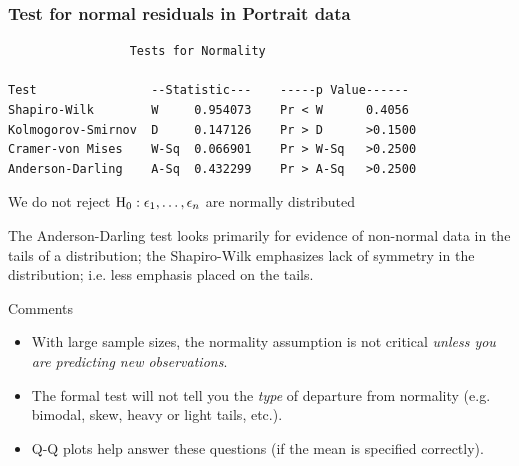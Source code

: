 \documentclass{beamer}
\begin{document}
\begin{frame}[fragile]
\frametitle{Test for normal residuals in Portrait data}
\begin{small}
\begin{verbatim}
                 Tests for Normality
                 
Test                --Statistic---    -----p Value------
Shapiro-Wilk        W     0.954073    Pr < W      0.4056
Kolmogorov-Smirnov  D     0.147126    Pr > D      >0.1500
Cramer-von Mises    W-Sq  0.066901    Pr > W-Sq   >0.2500
Anderson-Darling    A-Sq  0.432299    Pr > A-Sq   >0.2500
\end{verbatim}
\end{small}
\vspace{10pt}

We do not reject ${\rm H}_0: \epsilon_1,\ldots,\epsilon_n$ are normally distributed
\vspace{10pt}

\pause The Anderson-Darling test looks primarily for evidence of non-normal data in the tails of a distribution; the Shapiro-Wilk emphasizes lack of symmetry in the distribution; i.e. less emphasis placed on the tails.
\end{frame}

\begin{frame}{Comments}
\begin{itemize}
\item With large sample sizes, the normality assumption is not
critical \textit{unless you are predicting new observations}.
\item<2-> The formal test will not tell you the \textit{type} of departure from
normality (e.g. bimodal, skew, heavy or light tails, etc.).
\item<2-> Q-Q plots help answer these questions (if the mean is
specified correctly).
\end{itemize}
\end{frame}
\end{document}
